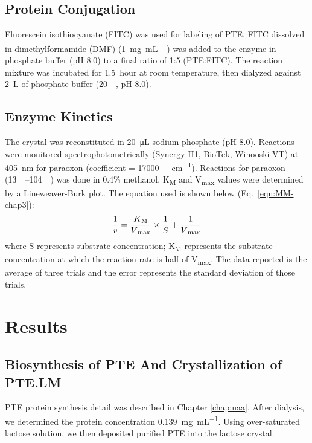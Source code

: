 \begin{refsection}
\subsection{Protein Conjugation}

Fluorescein isothiocyanate (FITC) was used
for labeling of PTE. FITC dissolved in dimethylformamide (DMF)
(\SI{1}{\mg\per\mL}) was added to the enzyme in phosphate buffer (pH 8.0) to a
final ratio of 1:5 (PTE:FITC). The reaction mixture was incubated for
\SI{1.5}{hour} at room temperature, then dialyzed against \SI{2}{\liter} of
phosphate buffer (\SI{20}{\milli\Molar}, pH 8.0). 

\subsection{Enzyme Kinetics}

The crystal was reconstituted in \SI{20}{\micro\liter} sodium phosphate (pH
8.0). Reactions were monitored spectrophotometrically (Synergy H1, BioTek,
Winooski VT) at \SI{405}{\nm} for paraoxon (coefficient =
\SI{17000}{\per\Molar\per\cm}).  Reactions for paraoxon
(\SIrange{13}{104}{\micro\Molar}) was done in 0.4\% methanol.
K\textsubscript{M} and V\textsubscript{max} values were determined by a
Lineweaver-Burk plot.\cite{Baker2011b} The equation used is shown below
(Eq.~\ref{eqn:MM-chap3}): 
\begin{equation} 
    \frac{1}{v} =
    \frac{K\textsubscript{M}}{V\textsubscript{max}}\times\frac{1}{S} +
    \frac{1}{V\textsubscript{max}} 
    \label{eqn:MM-chap3}
\end{equation}
where S represents substrate concentration; K\textsubscript{M} represents the
substrate concentration at which the reaction rate is half of
V\textsubscript{max}. The data reported is the average of three trials and the
error represents the standard deviation of those trials.

\section{Results}

\subsection{Biosynthesis of PTE And Crystallization of PTE.LM}

PTE protein synthesis detail was described in Chapter \ref{chap:uaa}. After
dialysis, we determined the protein concentration \SI{0.139}{\mg\per\mL}. Using
over-saturated lactose solution, we then deposited purified PTE into the
lactose crystal. 


\end{refsection}
